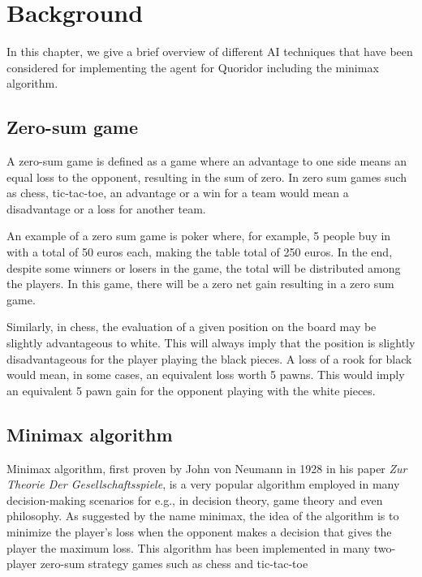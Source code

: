 \chapter{Background}
\label{background}

In this chapter, we give a brief overview of different \ac{AI} techniques that have been considered for implementing the agent for Quoridor including the minimax algorithm.

\section{Zero-sum game}
A zero-sum game is defined as a game where an advantage to one side means an equal loss to the opponent, resulting in the sum of zero. In zero sum games such as chess, tic-tac-toe, an advantage or a win for a team would mean a disadvantage or a loss for another team. 

An example of a zero sum game is poker where, for example, 5 people buy in with a total of 50 euros each, making the table total of 250 euros. In the end, despite some winners or losers in the game, the total will be distributed among the players. In this game, there will be a zero net gain resulting in a zero sum game.

Similarly, in chess, the evaluation of a given position on the board may be slightly advantageous to white. This will always imply that the position is slightly disadvantageous for the player playing the black pieces. A loss of a rook for black would mean, in some cases, an equivalent loss worth 5 pawns. This would imply an equivalent 5 pawn gain for the opponent playing with the white pieces.


\section{Minimax algorithm}

Minimax algorithm, first proven by John von Neumann in 1928 in his paper \textit{Zur Theorie Der Gesellschaftsspiele}, is a very popular algorithm employed in many decision-making scenarios for e.g., in decision theory, game theory and even philosophy. As suggested by the name minimax, the idea of the algorithm is to minimize the player's loss when the opponent makes a decision that gives the player the maximum loss. This algorithm has been implemented in many two-player zero-sum strategy games such as chess and tic-tac-toe

